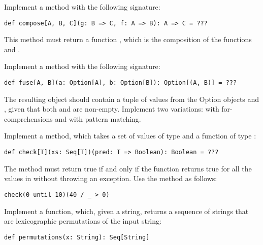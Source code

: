 \documentclass[11pt]{article}
\begin{document}
\begin{myExercise}
Implement a  method with the following signature:
\begin{lstlisting}
def compose[A, B, C](g: B => C, f: A => B): A => C = ???
\end{lstlisting}
This method must return a function , which is the composition of the
functions  and .
\end{myExercise}

\begin{myExercise}
Implement a  method with the following signature:
\begin{lstlisting}
def fuse[A, B](a: Option[A], b: Option[B]): Option[(A, B)] = ???
\end{lstlisting}
The resulting  object should contain a tuple of values from the Option objects  and , given that both  and  are non-empty. Implement two variations: with for-comprehensions and with pattern matching.
\end{myExercise}

\begin{myExercise}
Implement a  method, which takes a set of values of type  and a function of type :
\begin{lstlisting}
def check[T](xs: Seq[T])(pred: T => Boolean): Boolean = ???
\end{lstlisting}
The method must return true if and only if the  function returns true for all the values in  without throwing an exception. Use the  method as follows:
\begin{lstlisting}
check(0 until 10)(40 / _ > 0)
\end{lstlisting}
\end{myExercise}


\begin{myExercise}
Implement a  function, which, given a string, returns a sequence of strings that are lexicographic permutations of the input string:
\begin{lstlisting}
def permutations(x: String): Seq[String]
\end{lstlisting}
\end{myExercise}
\end{document}
